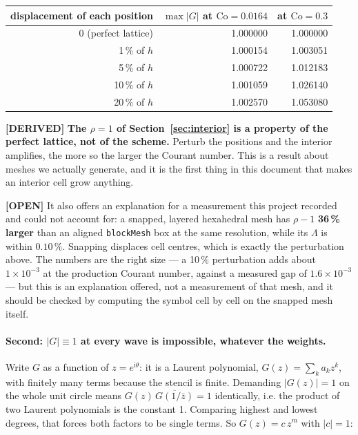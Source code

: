 \documentclass[11pt,a4paper]{article}
\newcommand{\derived}{\textcolor{blue!50!black}{\textbf{[DERIVED]}}}
\newcommand{\opn}{\textcolor{orange!80!black}{\textbf{[OPEN]}}}
\begin{document}
\begin{center}
\begin{tabular}{rrr}
\toprule
displacement of each position & \(\max|G|\) at \(\mathrm{Co}=0.0164\) & at \(\mathrm{Co}=0.3\) \\
\midrule
0 (perfect lattice) & 1.000000 & 1.000000 \\
1\,\% of \(h\)      & 1.000154 & 1.003051 \\
5\,\% of \(h\)      & 1.000722 & 1.012183 \\
10\,\% of \(h\)     & 1.001059 & 1.026140 \\
20\,\% of \(h\)     & 1.002570 & 1.053080 \\
\bottomrule
\end{tabular}
\end{center}

\derived{} \textbf{The \(\rho = 1\) of Section~\ref{sec:interior} is a property of the perfect
lattice, not of the scheme.} Perturb the positions and the interior amplifies, the more so the
larger the Courant number. This is a result about meshes we actually generate, and it is the
first thing in this document that makes an interior cell grow anything.

\opn{} It also offers an explanation for a measurement this project recorded and could not
account for: a snapped, layered hexahedral mesh has \(\rho-1\) \textbf{36\,\% larger} than an
aligned \texttt{blockMesh} box at the same resolution, while its \(\Lambda\) is within
\(0.10\,\%\). Snapping displaces cell centres, which is exactly the perturbation above. The
numbers are the right size --- a 10\,\% perturbation adds about \(1\times10^{-3}\) at the
production Courant number, against a measured gap of \(1.6\times10^{-3}\) --- but this is an
explanation offered, not a measurement of that mesh, and it should be checked by computing the
symbol cell by cell on the snapped mesh itself.

\paragraph{Second: \(|G| \equiv 1\) at every wave is impossible, whatever the weights.}
Write \(G\) as a function of \(z = e^{\mathrm{i}\theta}\): it is a Laurent polynomial,
\(G(z) = \sum_k a_k z^{k}\), with finitely many terms because the stencil is finite. Demanding
\(|G(z)| = 1\) on the whole unit circle means \(G(z)\,\overline{G(1/\bar z)} = 1\) identically,
i.e. the product of two Laurent polynomials is the constant 1. Comparing highest and lowest
degrees, that forces both factors to be single terms. So \(G(z) = c\,z^{m}\) with \(|c| = 1\):
\end{document}
